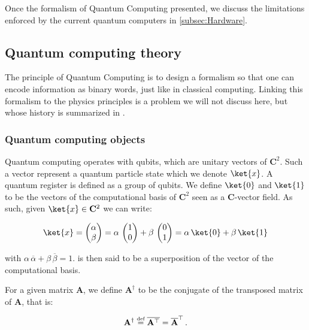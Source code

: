 \documentclass[11pt, a4paper]{article}
\begin{document}
        Once the formalism of Quantum Computing presented, we discuss the limitations enforced by the current quantum computers in \autoref{subsec:Hardware}.
        \subsection{Quantum computing theory}
            \label{subsec:QCT}
            The principle of Quantum Computing is to design a formalism so that one can encode information as binary words, just like in classical computing. Linking this formalism to the physics principles is a problem we will not discuss here, but whose history is summarized in \cite{HistoryEquivalence}.
            \subsubsection{Quantum computing objects}
                Quantum computing operates with qubits, which are unitary vectors of \(\mathbf{C}^2\). Such a vector represent a quantum particle state which we denote \(\ket{x}\). A quantum register is defined as a group of qubits. We define \(\ket{0}\) and \(\ket{1}\) to be the vectors of the computational basis of \(\mathbf{C}^2\) seen as a \(\mathbf{C}\)-vector field. As such, given \(\ket{x}\in\mathbf{C}^2\) we can write:
                
                \[\ket{x} = \begin{pmatrix}\alpha\\\beta\end{pmatrix}=\alpha\,\begin{pmatrix}1\\0\end{pmatrix} + \beta\,\begin{pmatrix}0\\1\end{pmatrix}=\alpha\,\ket{0} + \beta\,\ket{1}\]
                
                with \(\alpha\,\overline{\alpha} + \beta\,\overline{\beta} = 1\).  is then said to be a superposition of the vector of the computational basis.
                
                For a given matrix \(\mathbf{A}\), we define \(\mathbf{A}^\dagger\) to be the conjugate of the transposed matrix of \(\mathbf{A}\), that is:
                
                \[\mathbf{A}^\dagger \overset{\text{\tiny{def}}}{=} \overline{\mathbf{A}^\top} = \overline{\mathbf{A}}^\top\,.\]
                
\end{document}
